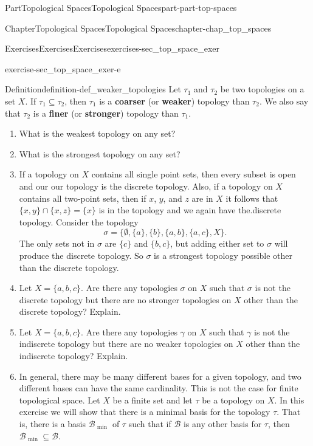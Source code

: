 \documentclass[oneside,10pt,]{book}
\newcommand{\terminology}[1]{\textbf{#1}}
\numberwithin{equation}{chapter}
\newcommand{\B}{\mathcal{B}}
\begin{document}
\begin{partptx}{Part}{Topological Spaces}{}{Topological Spaces}{}{}{part-part-top-spaces}
\begin{chapterptx}{Chapter}{Topological Spaces}{}{Topological Spaces}{}{}{chapter-chap_top_spaces}
\begin{exercises-section}{Exercises}{Exercises}{}{Exercises}{}{}{exercises-sec_top_space_exer}
\begin{divisionexercise}{5}{}{}{exercise-sec_top_space_exer-e}
\begin{definition}{Definition}{}{definition-def_weaker_topologies}%
Let \(\tau_1\) and \(\tau_2\) be two topologies on a set \(X\). If \(\tau_1 \subseteq \tau_2\), then \(\tau_1\) is a \terminology{coarser} (or \terminology{weaker}) topology than \(\tau_2\). We also say that \(\tau_2\) is a \terminology{finer} (or \terminology{stronger}) topology than \(\tau_1\).%
\end{definition}
\begin{enumerate}[font=\bfseries,label=(\alph*),ref=\alph*]%
\item{}What is the weakest topology on any set?%
\item{}What is the strongest topology on any set?%
\item{}If a topology on \(X\) contains all single point sets, then every subset is open and our our topology is the discrete topology. Also, if a topology on \(X\) contains all two-point sets, then if \(x\), \(y\), and \(z\) are in \(X\) it follows that \(\{x,y\} \cap \{x,z\} = \{x\}\) is in the topology and we again have the.discrete topology. Consider the topology%
\begin{equation*}
\sigma = \{\emptyset, \{a\}, \{b\}, \{a,b\}, \{a,c\}, X\}\text{.}
\end{equation*}
The only sets not in \(\sigma\) are \(\{c\}\) and \(\{b,c\}\), but adding either set to \(\sigma\) will produce the discrete topology. So \(\sigma\) is a strongest topology possible other than the discrete topology.%
\item{}Let \(X = \{a,b,c\}\). Are there any topologies \(\sigma\) on \(X\) such that \(\sigma\) is not the discrete topology but there are no stronger topologies on \(X\) other than the discrete topology? Explain.%
\item{}Let \(X = \{a,b,c\}\). Are there any topologies \(\gamma\) on \(X\) such that \(\gamma\) is not the indiscrete topology but there are no weaker topologies on \(X\) other than the indiscrete topology? Explain.%
\item{}In general, there may be many different bases for a given topology, and two different bases can have the same cardinality. This is not the case for finite topological space. Let \(X\) be a finite set and let \(\tau\) be a topology on \(X\). In this exercise we will show that there is a minimal basis for the topology \(\tau\). That is, there is a basis \(\B_{\text{ min } }\) of \(\tau\) such that if \(\B\) is any other basis for \(\tau\), then \(\B_{\text{ min } } \subseteq \B\).%
\begin{enumerate}[font=\bfseries,label=(\roman*),ref=\theenumi.\roman*]%

\end{enumerate}
\end{enumerate}
\end{divisionexercise}
\end{exercises-section}
\end{chapterptx}
\end{partptx}
\end{document}
